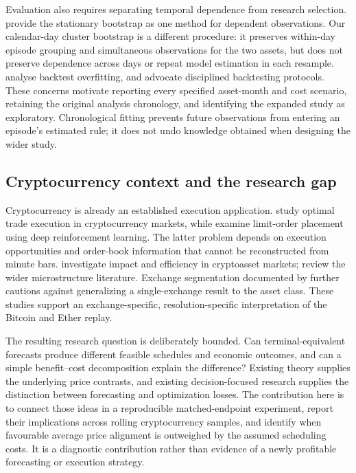 Evaluation also requires separating temporal dependence from research selection. \citet{politis1994} provide the stationary bootstrap as one method for dependent observations. Our calendar-day cluster bootstrap is a different procedure: it preserves within-day episode grouping and simultaneous observations for the two assets, but does not preserve dependence across days or repeat model estimation in each resample. \citet{bailey2017} analyse backtest overfitting, and \citet{arnott2019} advocate disciplined backtesting protocols. These concerns motivate reporting every specified asset-month and cost scenario, retaining the original analysis chronology, and identifying the expanded study as exploratory. Chronological fitting prevents future observations from entering an episode's estimated rule; it does not undo knowledge obtained when designing the wider study.

\subsection{Cryptocurrency context and the research gap}
Cryptocurrency is already an established execution application. \citet{bundi2024} study optimal trade execution in cryptocurrency markets, while \citet{schnaubelt2022} examine limit-order placement using deep reinforcement learning. The latter problem depends on execution opportunities and order-book information that cannot be reconstructed from minute bars. \citet{barucci2023} investigate impact and efficiency in cryptoasset markets; \citet{almeida2024} review the wider microstructure literature. Exchange segmentation documented by \citet{makarov2020} further cautions against generalizing a single-exchange result to the asset class. These studies support an exchange-specific, resolution-specific interpretation of the Bitcoin and Ether replay.

The resulting research question is deliberately bounded. Can terminal-equivalent forecasts produce different feasible schedules and economic outcomes, and can a simple benefit--cost decomposition explain the difference? Existing theory supplies the underlying price contrasts, and existing decision-focused research supplies the distinction between forecasting and optimization losses. The contribution here is to connect those ideas in a reproducible matched-endpoint experiment, report their implications across rolling cryptocurrency samples, and identify when favourable average price alignment is outweighed by the assumed scheduling costs. It is a diagnostic contribution rather than evidence of a newly profitable forecasting or execution strategy.
